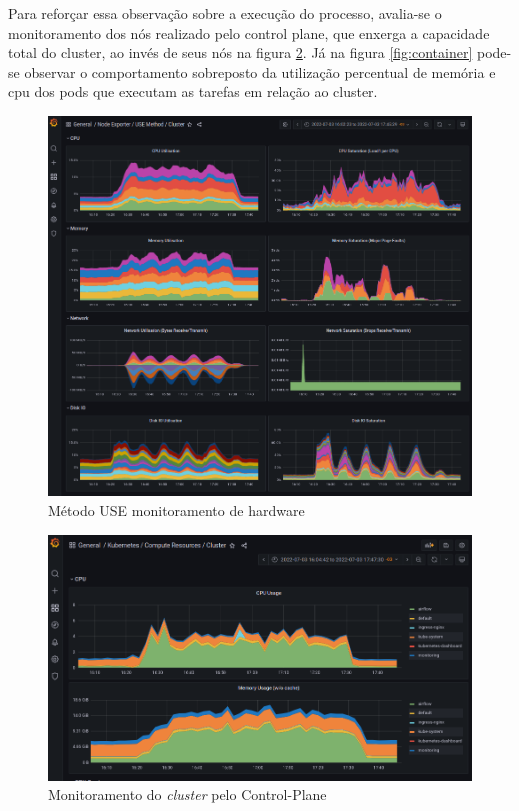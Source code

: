 Para reforçar essa observação sobre a execução do processo, avalia-se o monitoramento dos nós realizado pelo control plane, que enxerga a capacidade total do cluster, ao invés de seus nós na figura \ref{fig:cluster}. Já na figura \ref{fig:container} pode-se observar o comportamento sobreposto da utilização percentual de memória e cpu dos pods que executam as tarefas em relação ao cluster.

\begin{figure}[!ht]
    \centering
    \includegraphics[width=0.85\linewidth]{04-figuras/Usemethod.png}
    \caption{Método USE monitoramento de hardware}
    \label{fig:consumocluster}
\end{figure}

\begin{figure}[!ht]
    \centering
    \includegraphics[width=0.85\linewidth]{04-figuras/cluster_usage.png}
    \caption{Monitoramento do \emph{cluster} pelo Control-Plane}
    \label{fig:cluster}
\end{figure}

